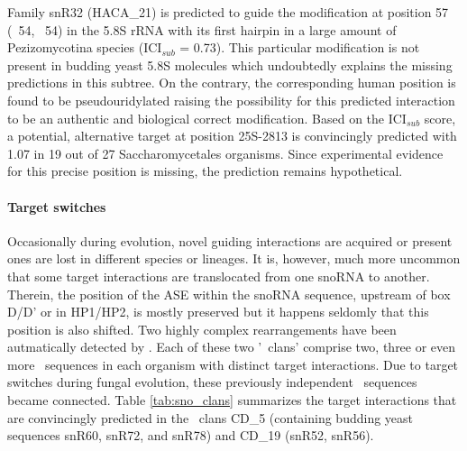 Family snR32 (HACA\_21) is
predicted to guide the modification at position 57 (\ncr\ 54, \sce\ 54) in the
5.8S rRNA with its first hairpin in a large amount of Pezizomycotina
species (ICI$_{sub}$ = 0.73). This particular modification is not present in budding yeast
5.8S molecules which undoubtedly explains the missing predictions in
this subtree. On the contrary, the corresponding human position is found to
be pseudouridylated raising the possibility for this predicted
interaction to be an authentic and biological correct modification.
Based on the ICI$_{sub}$ score, a potential, alternative target at
position 25S-2813 is convincingly predicted with 1.07 in 19 out of
27 Saccharomycetales organisms. Since experimental evidence for this
precise position is missing, the prediction remains hypothetical.

\paragraph{\textbf{Target switches}}
Occasionally during evolution, novel guiding interactions are acquired
or present ones are lost in different species or lineages. It is,
however, much more uncommon that some target interactions are
translocated from one snoRNA to another. Therein, the position of the ASE
within the snoRNA sequence, upstream of box D/D’ or in HP1/HP2, is mostly
preserved but it happens seldomly that this position is also
shifted. Two highly complex rearrangements have been autmatically
detected by \snostrip. Each of these two '\sno\ clans' comprise two,
three or even more \sno\ sequences in each organism with distinct
target interactions. Due to target switches during fungal evolution,
these previously independent \sno\ sequences became connected. Table
\ref{tab:sno_clans} summarizes the target interactions that are convincingly predicted in the \sno\ clans CD\_5 (containing budding yeast sequences snR60, snR72, and snR78) and CD\_19 (snR52, snR56).
